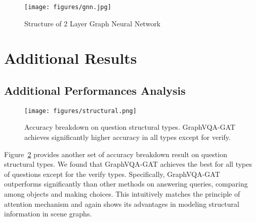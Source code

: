 \documentclass[11pt]{article}
\begin{document}
\begin{figure}[t]
    \centering
    \texttt{[image: figures/gnn.jpg]}
\caption{
    \small 
    Structure of 2 Layer Graph Neural Network
}
    \label{fig:gnn}
\end{figure}




 
\section{Additional Results}



\subsection{Additional Performances Analysis}
\label{app_res_analysis}

\begin{figure}[t]

    \centering
    \texttt{[image: figures/structural.png]}
   
    \caption{
    Accuracy breakdown on question structural types. 
    GraphVQA-GAT achieves significantly higher accuracy in all types except for verify.
} \label{fig:structural}
    
\end{figure}
Figure~\ref{fig:structural} provides another set of accuracy breakdown result on question structural types. We found that GraphVQA-GAT achieves the best for all types of questions except for the verify types.
Specifically, GraphVQA-GAT outperforms significantly than other methods on answering queries, comparing among objects and making choices. This intuitively matches the principle of attention mechanism and again shows its advantages in modeling structural information in scene graphs.
\end{document}
